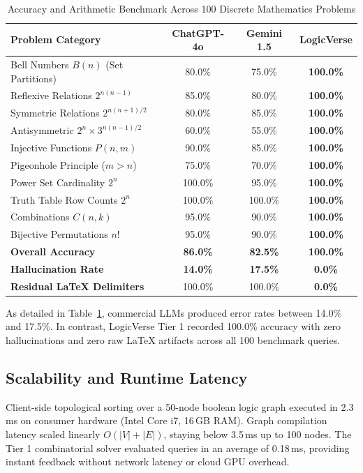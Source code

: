 \documentclass[conference]{IEEEtran}
\begin{document}
\begin{table}[htbp]
\centering
\caption{Accuracy and Arithmetic Benchmark Across 100 Discrete Mathematics Problems}
\label{tab:benchmark}
\begin{tabular}{lccc}
\toprule
\textbf{Problem Category} & \textbf{ChatGPT-4o} & \textbf{Gemini 1.5} & \textbf{LogicVerse} \\
\midrule
Bell Numbers $B(n)$ (Set Partitions) & 80.0\% & 75.0\% & \textbf{100.0\%} \\
Reflexive Relations $2^{n(n-1)}$ & 85.0\% & 80.0\% & \textbf{100.0\%} \\
Symmetric Relations $2^{n(n+1)/2}$ & 80.0\% & 85.0\% & \textbf{100.0\%} \\
Antisymmetric $2^n \times 3^{n(n-1)/2}$ & 60.0\% & 55.0\% & \textbf{100.0\%} \\
Injective Functions $P(n, m)$ & 90.0\% & 85.0\% & \textbf{100.0\%} \\
Pigeonhole Principle ($m > n$) & 75.0\% & 70.0\% & \textbf{100.0\%} \\
Power Set Cardinality $2^n$ & 100.0\% & 95.0\% & \textbf{100.0\%} \\
Truth Table Row Counts $2^n$ & 100.0\% & 100.0\% & \textbf{100.0\%} \\
Combinations $C(n, k)$ & 95.0\% & 90.0\% & \textbf{100.0\%} \\
Bijective Permutations $n!$ & 95.0\% & 90.0\% & \textbf{100.0\%} \\
\midrule
\textbf{Overall Accuracy} & \textbf{86.0\%} & \textbf{82.5\%} & \textbf{100.0\%} \\
\textbf{Hallucination Rate} & \textbf{14.0\%} & \textbf{17.5\%} & \textbf{0.0\%} \\
\textbf{Residual \LaTeX{} Delimiters} & 100.0\% & 100.0\% & \textbf{0.0\%} \\
\bottomrule
\end{tabular}
\end{table}

As detailed in Table~\ref{tab:benchmark}, commercial LLMs produced error rates between 14.0\% and 17.5\%. In contrast, LogicVerse Tier 1 recorded 100.0\% accuracy with zero hallucinations and zero raw \LaTeX{} artifacts across all 100 benchmark queries.

\subsection{Scalability and Runtime Latency}
Client-side topological sorting over a 50-node boolean logic graph executed in 2.3\,ms on consumer hardware (Intel Core i7, 16\,GB RAM). Graph compilation latency scaled linearly $O(|V| + |E|)$, staying below 3.5\,ms up to 100 nodes. The Tier 1 combinatorial solver evaluated queries in an average of 0.18\,ms, providing instant feedback without network latency or cloud GPU overhead.
\end{document}
